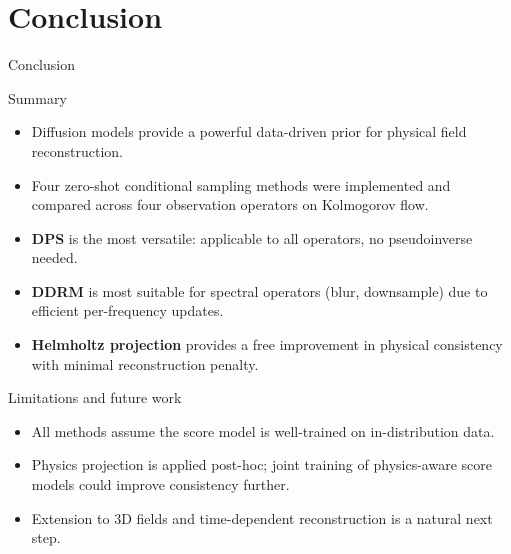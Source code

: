 \documentclass[9pt]{beamer}
\begin{document}
\section{Conclusion}

\begin{frame}{Conclusion}
\begin{block}{Summary}
\begin{itemize}
  \item Diffusion models provide a powerful data-driven prior for physical field reconstruction.
  \item Four zero-shot conditional sampling methods were implemented and compared
        across four observation operators on Kolmogorov flow.
  \item \textbf{DPS} is the most versatile: applicable to all operators, no pseudoinverse needed.
  \item \textbf{DDRM} is most suitable for spectral operators (blur, downsample) due to efficient
        per-frequency updates.
  \item \textbf{Helmholtz projection} provides a free improvement in physical consistency
        with minimal reconstruction penalty.
\end{itemize}
\end{block}
\begin{block}{Limitations and future work}
\begin{itemize}
  \item All methods assume the score model is well-trained on in-distribution data.
  \item Physics projection is applied post-hoc; joint training of physics-aware score models
        could improve consistency further.
  \item Extension to 3D fields and time-dependent reconstruction is a natural next step.
\end{itemize}
\end{block}
\end{frame}

\end{document}
